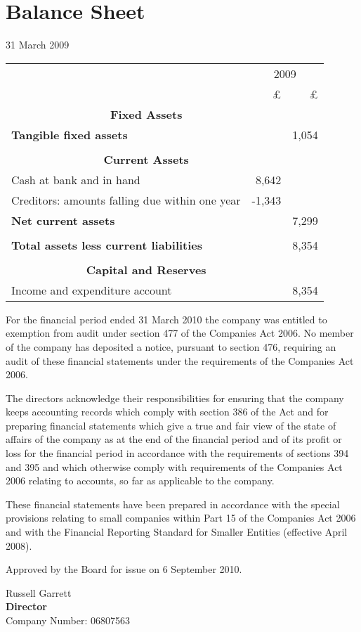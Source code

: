 \section{Balance Sheet}
31 March 2009

\begin{center}
\begin{tabular}{  l  r  r }
\toprule
                            & \multicolumn{2}{c}{2009} \\
\cmidrule(r){2-3}
                            & £     & £ \\
    \multicolumn{2}{c}{{\bf Fixed Assets}} &\\
    {\bf Tangible fixed assets}   &       & 1,054 \\ \cmidrule{2-3} \\
    \multicolumn{2}{c}{{\bf Current Assets}}&\\
    Cash at bank and in hand & 8,642 & \\
    Creditors: amounts falling due within one year & -1,343 & \\
    {\bf Net current assets}    &   & 7,299 \\ \cmidrule{2-3} \\
    {\bf Total assets less current liabilities} & & 8,354 \\ \cmidrule{2-3} \\
    \multicolumn{2}{c}{{\bf Capital and Reserves}}&\\
    Income and expenditure account     &   &   8,354 \\
\bottomrule
\end{tabular}

\end{center}

{\footnotesize For the financial period ended 31 March 2010 the
company was entitled to exemption from audit under section 477 of the
Companies Act 2006. No member of the company has deposited a
notice, pursuant to section 476, requiring an audit of these
financial statements under the requirements of the Companies Act
2006.

The directors acknowledge their responsibilities for ensuring that
the company keeps accounting records which comply with section 386
of the Act and for preparing financial statements which give a true
and fair view of the state of affairs of the company as at the end
of the financial period and of its profit or loss for the financial
period in accordance with the requirements of sections 394 and 395
and which otherwise comply with requirements of the Companies Act
2006 relating to accounts, so far as applicable to the company.

These financial statements have been prepared in accordance with
the special provisions relating to small companies within Part 15
of the Companies Act 2006 and with the Financial Reporting Standard
for Smaller Entities (effective April 2008).}

\vfill

Approved by the Board for issue on 6 September 2010.
\vspace{48pt}

Russell Garrett \\
{\bf Director} \\
Company Number: 06807563
